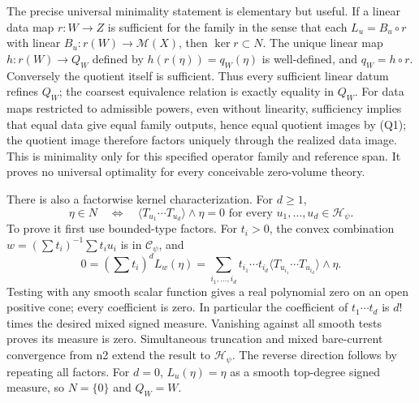 \documentclass[
  11pt,
]{article}
\begin{document}
The precise universal minimality statement is elementary but useful. If
a linear data map \(r:W\to Z\) is sufficient for the family in the sense
that each \(L_u=B_u\circ r\) with linear \(B_u:r(W)\to\mathcal{M}(X)\),
then \(\ker r\subset N\). The unique linear map \(h:r(W)\to Q_W\)
defined by \(h(r(\eta))=q_W(\eta)\) is well-defined, and
\(q_W=h\circ r\). Conversely the quotient itself is sufficient. Thus
every sufficient linear datum refines \(Q_W\); the coarsest equivalence
relation is exactly equality in \(Q_W\). For data maps restricted to
admissible powers, even without linearity, sufficiency implies that
equal data give equal family outputs, hence equal quotient images by
(Q1); the quotient image therefore factors uniquely through the realized
data image. This is minimality only for this specified operator family
and reference span. It proves no universal optimality for every
conceivable zero-volume theory.

There is also a factorwise kernel characterization. For \(d\geq1\), \[
\eta\in N\quad\Longleftrightarrow\quad
\langle T_{u_1}\cdots T_{u_d}\rangle\wedge\eta=0
\text{ for every }u_1,\ldots,u_d\in\mathcal{H}_\psi. \tag{Q2}
\] To prove it first use bounded-type factors. For \(t_i>0\), the convex
combination \(w=(\sum t_i)^{-1}\sum t_iu_i\) is in \(\mathcal{C}_\psi\),
and \[
0=(\sum t_i)^d L_w(\eta)
=\sum_{i_1,\ldots,i_d}t_{i_1}\cdots t_{i_d}
\langle T_{u_{i_1}}\cdots T_{u_{i_d}}\rangle\wedge\eta.
\] Testing with any smooth scalar function gives a real polynomial zero
on an open positive cone; every coefficient is zero. In particular the
coefficient of \(t_1\cdots t_d\) is \(d!\) times the desired mixed
signed measure. Vanishing against all smooth tests proves its measure is
zero. Simultaneous truncation and mixed bare-current convergence from n2
extend the result to \(\mathcal{H}_\psi\). The reverse direction follows
by repeating all factors. For \(d=0\), \(L_u(\eta)=\eta\) as a smooth
top-degree signed measure, so \(N=\{0\}\) and \(Q_W=W\).
\end{document}

